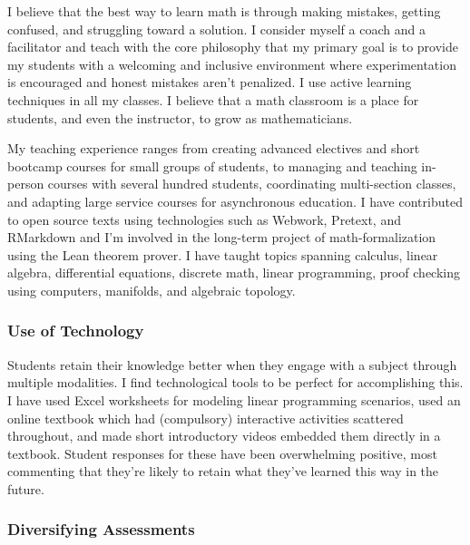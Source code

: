 \documentclass[
]{report}
\begin{document}
I believe that the best way to learn math is through making mistakes, getting confused, and struggling toward a solution. I consider myself a coach and a facilitator and teach with the core philosophy that my primary goal is to provide my students with a welcoming and inclusive environment where experimentation is encouraged and honest mistakes aren't penalized.
I use active learning techniques in all my classes.
I believe that a math classroom is a place for students, and even the instructor, to grow as mathematicians.

My teaching experience ranges from creating advanced electives and short bootcamp courses for small groups of students, to managing and teaching in-person courses with several hundred students, coordinating multi-section classes, and adapting large service courses for asynchronous education. I have contributed to open source texts using technologies such as Webwork, Pretext, and RMarkdown and I'm involved in the long-term project of math-formalization using the Lean theorem prover. I have taught topics spanning calculus, linear algebra, differential equations, discrete math, linear programming, proof checking using computers, manifolds, and algebraic topology.

\hypertarget{use-of-technology}{%
\subsubsection*{Use of Technology}\label{use-of-technology}}

Students retain their knowledge better when they engage with a subject through multiple modalities. I find technological tools to be perfect for accomplishing this. I have used Excel worksheets for modeling linear programming scenarios, used an online textbook which had (compulsory) interactive activities scattered throughout, and made short introductory videos embedded them directly in a textbook.
Student responses for these have been overwhelming positive, most commenting that they're likely to retain what they've learned this way in the future.

\hypertarget{diversifying-assessments}{%
\subsubsection*{Diversifying Assessments}\label{diversifying-assessments}}
\end{document}

